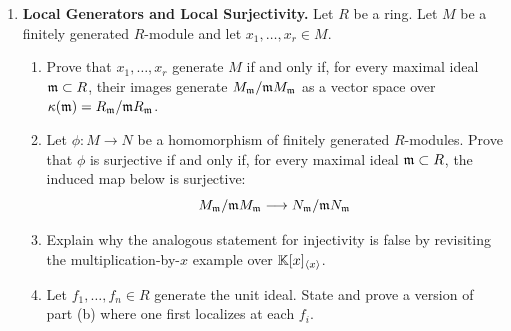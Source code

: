\documentclass[12pt,reqno]{amsart}
\begin{document}
\begin{enumerate}[leftmargin=*, resume=problems]
\item \textbf{Local Generators and Local Surjectivity.} Let $R$ be a ring. Let $M$ be a finitely generated $R$-module and let $x_1,\ldots,x_r\in M$.
\begin{enumerate}
    \item Prove that $x_1,\ldots,x_r$ generate $M$ if and only if, for every maximal ideal $\mathfrak{m}\subset R$, their images generate $M_{\mathfrak{m}}/\mathfrak{m} M_{\mathfrak{m}}$ as a vector space over $\kappa(\mathfrak{m})=R_{\mathfrak{m}}/\mathfrak{m} R_{\mathfrak{m}}$.
    \item Let $\phi:M\to N$ be a homomorphism of finitely generated $R$-modules. Prove that $\phi$ is surjective if and only if, for every maximal ideal $\mathfrak{m}\subset R$, the induced map below is surjective:
    \[
    M_{\mathfrak{m}}/\mathfrak{m} M_{\mathfrak{m}}\longrightarrow N_{\mathfrak{m}}/\mathfrak{m} N_{\mathfrak{m}}
    \]
    \item Explain why the analogous statement for injectivity is false by revisiting the multiplication-by-$x$ example over $\mathbb{K}[x]_{\langle x\rangle}$.
    \item Let $f_1,\ldots,f_n\in R$ generate the unit ideal. State and prove a version of part (b) where one first localizes at each $f_i$.
\end{enumerate}

\end{enumerate}
\end{document}
